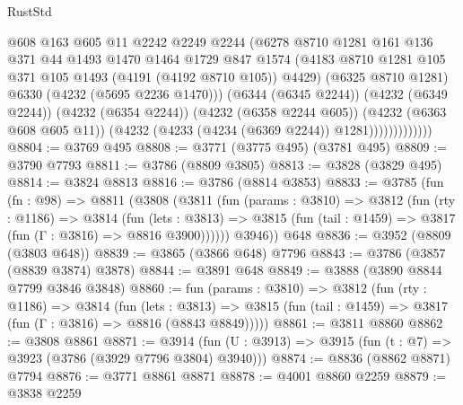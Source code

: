 \begin{lexlean}{RustStd}
\begin{coremodule}
                          @608
                          @163
                          @605
                          @11
                          @2242
                          @2249
                          @2244
                          (@6278
                            @8710
                            @1281
                            @161
                            @136
                            @371
                            @44
                            @1493
                            @1470
                            @1464
                            @1729
                            @847
                            @1574
                            (@4183
                              @8710
                              @1281
                              @105
                              @371
                              @105
                              @1493
                              (@4191 (@4192 @8710 @105))
                              @4429)
                            (@6325 @8710 @1281)
                            @6330
                            (@4232 (@5695 @2236 @1470)))
                          (@6344 (@6345 @2244))
                          (@4232 (@6349 @2244))
                          (@4232 (@6354 @2244))
                          (@4232 (@6358 @2244 @605))
                          (@4232 (@6363 @608 @605 @11))
                          (@4232 (@4233 (@4234 (@6369 @2244)) @1281)))))))))))))
@8804 := @3769 @495
@8808 := @3771 (@3775 @495) (@3781 @495)
@8809 := @3790 @7793
@8811 := @3786 (@8809 @3805)
@8813 := @3828 (@3829 @495)
@8814 := @3824 @8813
@8816 := @3786 (@8814 @3853)
@8833 := @3785
    (fun (fn : @98) =>
    @8811
      (@3808
        (@3811
          (fun (params : @3810) =>
          @3812
            (fun (rty : @1186) =>
            @3814
              (fun (lets : @3813) =>
              @3815 (fun (tail : @1459) => @3817 (fun (Γ : @3816) => @8816 @3900))))))
        @3946))
    @648
@8836 := @3952 (@8809 (@3803 @648))
@8839 := @3865 (@3866 @648) @7796
@8843 := @3786 (@3857 (@8839 @3874) @3878)
@8844 := @3891 @648
@8849 := @3888 (@3890 @8844 @7799 @3846 @3848)
@8860 := fun (params : @3810) =>
  @3812
    (fun (rty : @1186) =>
    @3814
      (fun (lets : @3813) =>
      @3815 (fun (tail : @1459) => @3817 (fun (Γ : @3816) => @8816 (@8843 @8849)))))
@8861 := @3811 @8860
@8862 := @3808 @8861
@8871 := @3914 (fun (U : @3913) => @3915 (fun (t : @7) => @3923 (@3786 (@3929 @7796 @3804) @3940)))
@8874 := @8836 (@8862 @8871) @7794
@8876 := @3771 @8861 @8871
@8878 := @4001 @8860 @2259
@8879 := @3838 @2259

\end{coremodule}
\end{lexlean}
